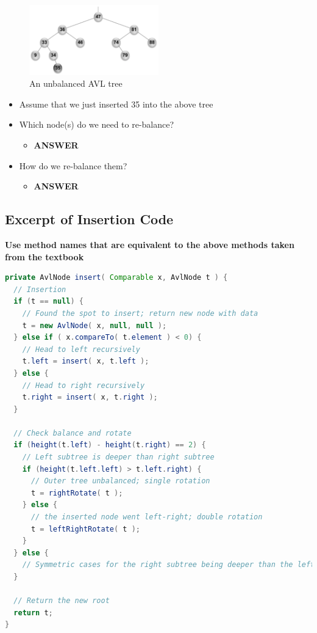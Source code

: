 \documentclass[
  10pt,
  english,
  letterpaper,
,tablecaptionabove
]{scrartcl}
\providecommand{\tightlist}{%
  \setlength{\itemsep}{0pt}\setlength{\parskip}{0pt}}
\begin{document}
\begin{figure}
\centering
\includegraphics[width=0.5\textwidth,height=\textheight]{images/3.png}
\caption{An unbalanced AVL tree}
\end{figure}

\begin{itemize}
\tightlist
\item
  Assume that we just inserted 35 into the above tree
\item
  Which node(s) do we need to re-balance?

  \begin{itemize}
  \tightlist
  \item
    \textbf{ANSWER}
  \end{itemize}
\item
  How do we re-balance them?

  \begin{itemize}
  \tightlist
  \item
    \textbf{ANSWER}
  \end{itemize}
\end{itemize}

\hypertarget{excerpt-of-insertion-code}{%
\subsection{Excerpt of Insertion Code}\label{excerpt-of-insertion-code}}

\textbf{Use method names that are equivalent to the above methods taken
from the textbook}

\begin{lstlisting}[language=Java]
private AvlNode insert( Comparable x, AvlNode t ) {
  // Insertion
  if (t == null) {
    // Found the spot to insert; return new node with data
    t = new AvlNode( x, null, null );
  } else if ( x.compareTo( t.element ) < 0) {
    // Head to left recursively
    t.left = insert( x, t.left );
  } else {
    // Head to right recursively
    t.right = insert( x, t.right );
  }

  // Check balance and rotate
  if (height(t.left) - height(t.right) == 2) {
    // Left subtree is deeper than right subtree
    if (height(t.left.left) > t.left.right) {
      // Outer tree unbalanced; single rotation
      t = rightRotate( t );
    } else {
      // the inserted node went left-right; double rotation
      t = leftRightRotate( t );
    }
  } else {
    // Symmetric cases for the right subtree being deeper than the left
  }

  // Return the new root
  return t;
}
\end{lstlisting}
\end{document}

